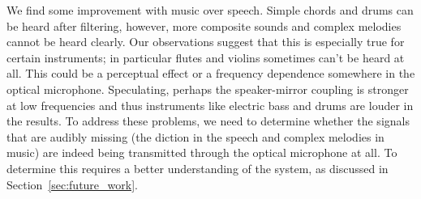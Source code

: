 \documentclass[paper-main.tex]{subfiles}
\begin{document}
We find some improvement with music over speech. 
Simple chords and drums can be heard after filtering, however, more composite sounds and complex melodies cannot be heard clearly. 
Our observations suggest that this is especially true for certain instruments; in particular flutes and violins sometimes can’t be heard at all. 
This could be a perceptual effect or a frequency dependence somewhere in the optical microphone.
Speculating, perhaps the speaker-mirror coupling is stronger at low frequencies and thus instruments like electric bass and drums are louder in the results.
To address these problems, we need to determine whether the signals that are audibly missing (the diction in the speech and complex melodies in music) are indeed being transmitted through the optical microphone at all. 
To determine this requires a better understanding of the system, as discussed in Section~\ref{sec:future_work}.
\end{document}
